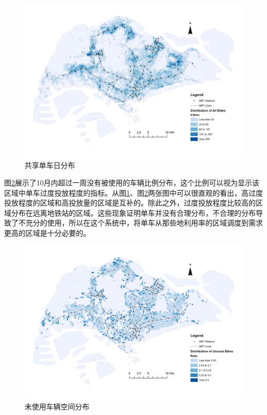 \documentclass[]{tongjithesis}
\numberwithin{equation}{chapter}
\begin{document}
\begin{figure}[H]
	\centering
	\includegraphics[width= 0.9 \textwidth]{figures_main/spatial_distribution_aday.png}
	\caption{共享单车日分布}
	\label{spatial_aday}
\end{figure}

图\ref{spatial_unused}展示了10月内超过一周没有被使用的车辆比例分布，这个比例可以视为显示该区域中单车过度投放程度的指标。从图\ref{spatial_aday}、图\ref{spatial_unused}两张图中可以很直观的看出，高过度投放程度的区域和高投放量的区域是互补的。除此之外，过度投放程度比较高的区域分布在远离地铁站的区域。这些现象证明单车并没有合理分布，不合理的分布导致了不充分的使用，所以在这个系统中，将单车从那些地利用率的区域调度到需求更高的区域是十分必要的。

\begin{figure}[H]
	\centering
	\includegraphics[width= 0.9 \textwidth]{figures_main/unused_spatial_distribution_ratio.png}
	\caption{未使用车辆空间分布}
	\label{spatial_unused}
\end{figure}
\end{document}
